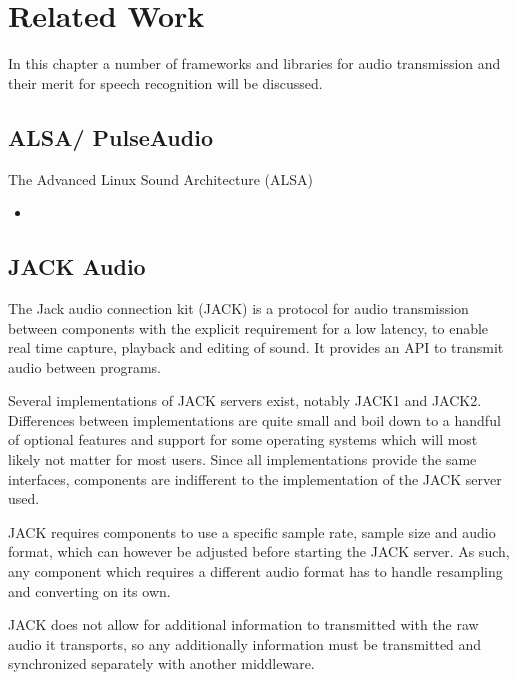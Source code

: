 
\chapter{Related Work}

In this chapter a number of frameworks and libraries for audio transmission and their merit for speech recognition will be discussed.

\section{ALSA/ PulseAudio}
The Advanced Linux Sound Architecture (ALSA) 

\begin{itemize}
	\item 
\end{itemize}

\section{JACK Audio}

The Jack audio connection kit (JACK) is a protocol for audio transmission between components with the explicit requirement for a low latency, to enable real time capture, playback and editing of sound. 
It provides an API to transmit audio between programs. 

Several implementations of JACK servers exist, notably JACK1 and JACK2. 
Differences between implementations are quite small and boil down to a handful of optional features and support for some operating systems which will most likely not matter for most users. %
Since all implementations provide the same interfaces, components are indifferent to the implementation of the JACK server used. 

JACK requires components to use a specific sample rate, sample size and audio format, which can however be adjusted before starting the JACK server. 
As such, any component which requires a different audio format has to handle resampling and converting on its own. 

JACK does not allow for additional information to transmitted with the raw audio it transports, so any additionally information must be transmitted and synchronized separately with another middleware. 

